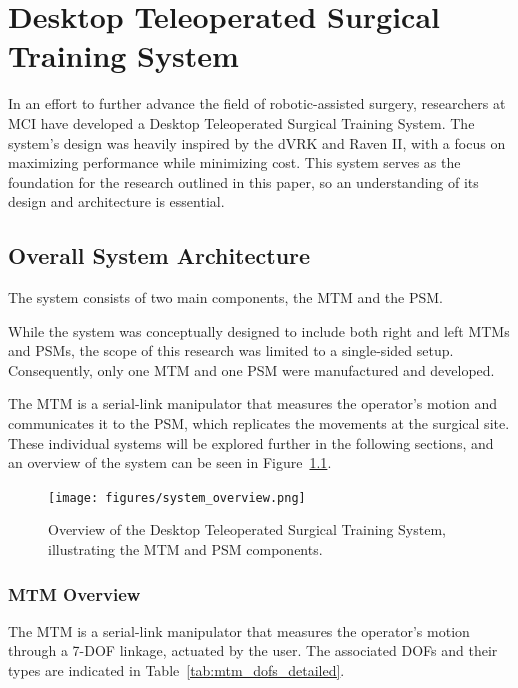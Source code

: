 \chapter{Desktop Teleoperated Surgical Training System}

In an effort to further advance the field of robotic-assisted surgery, researchers at MCI have developed a Desktop Teleoperated Surgical Training System. The system's design was heavily inspired by the dVRK and Raven II, with a focus on maximizing performance while minimizing cost. This system serves as the foundation for the research outlined in this paper, so an understanding of its design and architecture is essential.

\section{Overall System Architecture}

The system consists of two main components, the MTM and the PSM.

While the system was conceptually designed to include both right and left MTMs and PSMs, the scope of this research was limited to a single-sided setup. Consequently, only one MTM and one PSM were manufactured and developed.

The MTM is a serial-link manipulator that measures the operator's motion and communicates it to the PSM, which replicates the movements at the surgical site. These individual systems will be explored further in the following sections, and an overview of the system can be seen in Figure~\ref{fig:system_overview}.

\begin{figure}[H] %
    \centering
    \texttt{[image: figures/system\_overview.png]}
    \caption{ Overview of the Desktop Teleoperated Surgical Training System, illustrating the MTM and PSM components.}
    \label{fig:system_overview} %
\end{figure}


\subsection{MTM Overview}

The MTM is a serial-link manipulator that measures the operator's motion through a 7-DOF linkage, actuated by the user. The associated DOFs and their types are indicated in Table~\ref{tab:mtm_dofs_detailed}.

